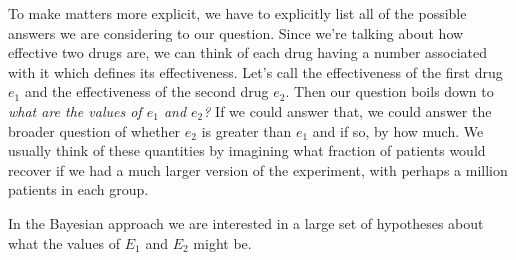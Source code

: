 \documentclass[a4paper, 12pt]{article}
\begin{document}
To make matters more explicit, we have to explicitly list all of the possible answers
we are considering to our question. Since we're talking about how effective
two drugs are, we can think of each drug having a number associated with it
which defines its effectiveness. Let's call the effectiveness of the first drug
$e_1$ and the effectiveness of the second drug $e_2$. Then our question boils
down to {\em what are the values of $e_1$ and $e_2$?} If we could answer that,
we could answer the broader question of whether $e_2$ is greater than $e_1$ and
if so, by how much. We usually think of these quantities by imagining what
fraction of patients would recover if we had a much larger version of the
experiment, with perhaps a million patients in each group.

In the Bayesian approach we are interested in a large set of hypotheses about
what the values of $E_1$ and $E_2$ might be.









\end{document}
